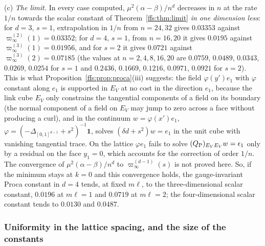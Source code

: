 \begin{remark}
(c) \emph{The limit.} In every case computed, $\mu^2(\alpha-\beta)/n^d$
decreases in $n$ at the rate $1/n$ towards the scalar constant of
Theorem~\ref{ffs:thm:limit} \emph{in one dimension less}: for $d=3$, $s=1$,
extrapolation in $1/n$ from $n=24,32$ gives $0.03353$ against $\varpi_\infty^{
(2)}(1)=0.03352$; for $d=4$, $s=1$, from $n=16,20$ it gives $0.0195$ against
$\varpi_\infty^{(3)}(1)=0.01956$, and for $s=2$ it gives $0.0721$ against
$\varpi_\infty^{(3)}(2)=0.07185$ (the values at $n=2,4,8,16,20$ are $0.0759$,
$0.0489$, $0.0343$, $0.0269$, $0.0254$ for $s=1$ and $0.2436$, $0.1669$,
$0.1216$, $0.0971$, $0.0921$ for $s=2$). This is what Proposition~\ref{ffs:prop:proca}(iii)
suggests: the field $\varphi(y')e_1$ with $\varphi$ constant along $e_1$ is
supported in $E_V$ at no cost in the direction $e_1$, because the link cube
$E_V$ only constrains the tangential components of a field on its boundary
(the normal component of a field on $E_V$ may jump to zero across a face
without producing a curl), and in the continuum $w=\varphi(x')e_1$, $\varphi=
(-\Delta_{[0,1]^{d-1}}+s^2)^{-1}\mathbf 1$, solves $(\delta d+s^2)w=e_1$ in the
unit cube with vanishing tangential trace. On the lattice $\varphi e_1$ fails
to solve $(Q_{\rm P})_{E_VE_V}w=\epsilon_1$ only by a residual on the face
$y_1=0$, which accounts for the correction of order $1/n$. The convergence of
$\mu^2(\alpha-\beta)/n^d$ to $\varpi_\infty^{(d-1)}(s)$ is not proved here.
So, if the minimum stays at $k=0$ and this convergence holds, the gauge-invariant Proca constant in $d=4$
tends, at fixed $m\ell$, to the three-dimensional scalar constant, $0.0196$ at
$m\ell=1$ and $0.0719$ at $m\ell=2$; the four-dimensional scalar constant tends
to $0.0130$ and $0.0487$.
\end{remark}

\subsubsection{Uniformity in the lattice spacing, and the size of the constants}

